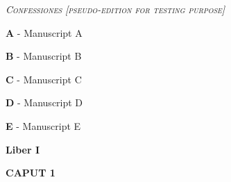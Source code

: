 \documentclass{article}
\begin{document}
 
      \thispagestyle{empty}
        \begin{center}\begin{Large} \textsc{\emph{Confessiones [pseudo-edition for testing purpose]}}
        \end{Large}\end{center} \vspace{0.8cm} 
      \par \textbf{A} - Manuscript A 
      \par \textbf{B} - Manuscript B 
      \par \textbf{C} - Manuscript C 
      \par \textbf{D} - Manuscript D 
      \par \textbf{E} - Manuscript E
      \vspace{0.8cm}
      \beginnumbering       \vspace{0cm}
      \pstart  \begin{Large}\textbf{Liber I}\end{Large}
    \pend
    \vspace{0.1cm}   \vspace{0cm}
      \pstart  \begin{Large}\textbf{CAPUT 1}\end{Large}
    \pend
    \vspace{0.1cm}  
\end{document}
